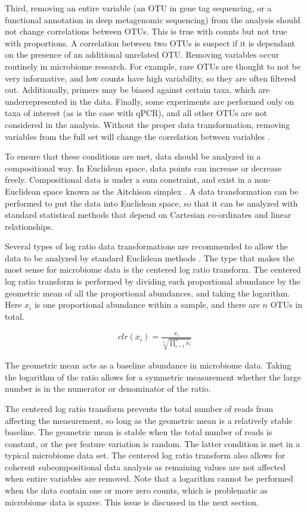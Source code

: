 Third, removing an entire variable (an OTU in gene tag sequencing, or a functional annotation in deep metagenomic sequencing) from the analysis should not change correlations between OTUs. This is true with counts but not true with proportions. A correlation between two OTUs is suspect if it is dependant on the presence of an additional unrelated OTU. Removing variables occur routinely in microbiome research. For example, rare OTUs are thought to not be very informative, and low counts have high variability, so they are often filtered out. Additionally, primers may be biased against certain taxa, which are underrepresented in the data. Finally, some experiments are performed only on taxa of interest (as is the case with qPCR), and all other OTUs are not considered in the analysis. Without the proper data transformation, removing variables from the full set will change the correlation between variables \cite{aitchison1982statistical}.

To ensure that these conditions are met, data should be analyzed in a compositional way. In Euclidean space, data points can increase or decrease freely. Compositional data is under a sum constraint, and exist in a non-Euclidean space known as the Aitchison simplex \cite{aitchison1982statistical}. A data transformation can be performed to put the data into Euclidean space, so that it can be analyzed with standard statistical methods that depend on Cartesian co-ordinates and linear relationships.

Several types of log ratio data transformations are recommended to allow the data to be analyzed by standard Euclidean methods \cite{aitchison1982statistical}. The type that makes the most sense for microbiome data is the centered log ratio transform. The centered log ratio transform is performed by dividing each proportional abundance by the geometric mean of all the proportional abundances, and taking the logarithm. Here $x_i$ is one proportional abundance within a sample, and there are $n$ OTUs in total.

\begin{align*}
clr(x_i) = \frac{x_i}{\sqrt[n]{\prod_{i=1}^{n} x_i}}
\end{align*}

The geometric mean acts as a baseline abundance in microbiome data. Taking the logarithm of the ratio allows for a symmetric measurement whether the large number is in the numerator or denominator of the ratio.

The centered log ratio transform prevents the total number of reads from affecting the measurement, so long as the geometric mean is a relatively stable baseline. The geometric mean is stable when the total number of reads is constant, or the per feature variation is random. The latter condition is met in a typical microbiome data set. The centered log ratio transform also allows for coherent subcompositional data analysis as remaining values are not affected when entire variables are removed. Note that a logarithm cannot be performed when the data contain one or more zero counts, which is problematic as microbiome data is sparse. This issue is discussed in the next section.

